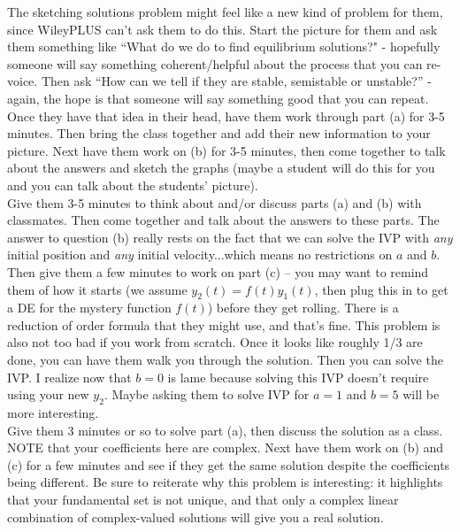 \documentclass[12pt]{article}
\newcommand{\noi}{\noindent}
\begin{document}
\noi{\bf For \#14. } The sketching solutions problem might feel like a new kind of problem for them, since WileyPLUS can't ask them to do this.  Start the picture for them and ask them something like ``What do we do to find equilibrium solutions?" - hopefully someone will say something coherent/helpful about the process that you can re-voice.  Then ask ``How can we tell if they are stable, semistable or unstable?'' - again, the hope is that someone will say something good that you can repeat.  Once they have that idea in their head, have them work through part (a) for 3-5 minutes.  Then bring the class together and add their new information to your picture.  Next have them work on (b) for 3-5 minutes, then come together to talk about the answers and sketch the graphs (maybe a student will do this for you and you can talk about the students' picture).\\

\noi{\bf For \#18. } Give them 3-5 minutes to think about and/or discuss parts (a) and (b) with classmates.  Then come together and talk about the answers to these parts.  The answer to question (b) really rests on the fact that we can solve the IVP with \textit{any} initial position and \textit{any} initial velocity...which means no restrictions on $a$ and $b$.   Then give them a few minutes to work on part (c) -- you may want to remind them of how it starts (we assume $y_2(t) = f(t)y_1(t)$, then plug this in to get a DE for the mystery function $f(t)$) before they get rolling.  There is a reduction of order formula that they might use, and that's fine.  This problem is also not too bad if you work from scratch.  Once it looks like roughly 1/3 are done, you can have them walk you through the solution.  Then you can solve the IVP.  I realize now that $b=0$ is lame because solving this IVP doesn't require using your new $y_2$.  Maybe asking them to solve IVP for $a=1$ and $b=5$ will be more interesting.\\

\noi{\bf For \#19. }  Give them 3 minutes or so to solve part (a), then discuss the solution as a class.  NOTE that your coefficients here are complex.  Next have them work on (b) and (c) for a few minutes and see if they get the same solution despite the coefficients being different.  Be sure to reiterate why this problem is interesting: it highlights that your fundamental set is not unique, and that only a complex linear combination of complex-valued solutions will give you a real solution.\\  
\end{document}
